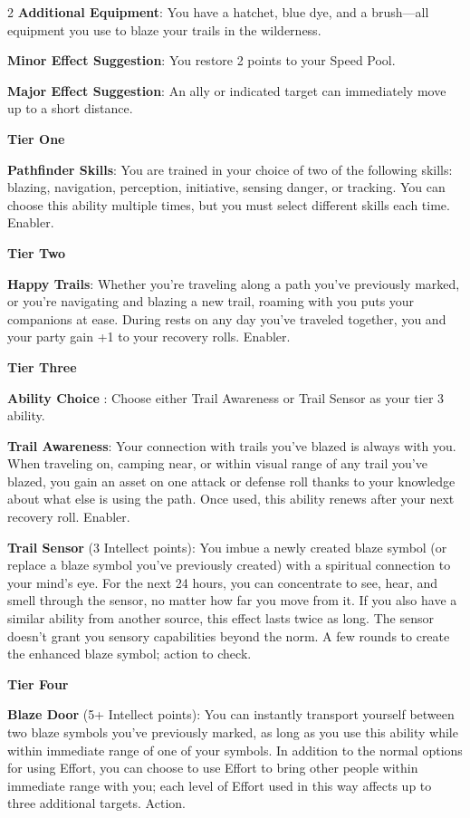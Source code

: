 \begin{multicols}{2}
\textbf{Additional Equipment}: You have a hatchet, blue dye, and a brush—all equipment you use to blaze your trails in the wilderness. 

\textbf{Minor Effect Suggestion}: You restore 2 points to your Speed Pool. 

\textbf{Major Effect Suggestion}: An ally or indicated target can immediately move up to a short distance.

\textbf{Tier One}

\textbf{Pathfinder Skills}: You are trained in your choice of two of the following skills: blazing, navigation, perception, initiative, sensing danger, or tracking. You can choose this ability multiple times, but you must select different skills each time. Enabler. 

\textbf{Tier Two}

\textbf{Happy Trails}: Whether you’re traveling along a path you’ve previously marked, or you’re navigating and blazing a new trail, roaming with you puts your companions at ease. During rests on any day you’ve traveled together, you and your party gain +1 to your recovery rolls. Enabler. 

\textbf{Tier Three}

\textbf{Ability Choice} : Choose either Trail Awareness or Trail Sensor as your tier 3 ability. 

\textbf{Trail Awareness}: Your connection with trails you’ve blazed is always with you. When traveling on, camping near, or within visual range of any trail you’ve blazed, you gain an asset on one attack or defense roll thanks to your knowledge about what else is using the path. Once used, this ability renews after your next recovery roll. Enabler. 

\textbf{Trail Sensor} (3 Intellect points): You imbue a newly created blaze symbol (or replace a blaze symbol you’ve previously created) with a spiritual connection to your mind’s eye. For the next 24 hours, you can concentrate to see, hear, and smell through the sensor, no matter how far you move from it. If you also have a similar ability from another source, this effect lasts twice as long. The sensor doesn’t grant you sensory capabilities beyond the norm. A few rounds to create the enhanced blaze symbol; action to check. 

\textbf{Tier Four}

\textbf{Blaze Door} (5+ Intellect points): You can instantly transport yourself between two blaze symbols you’ve previously marked, as long as you use this ability while within immediate range of one of your symbols. In addition to the normal options for using Effort, you can choose to use Effort to bring other people within immediate range with you; each level of Effort used in this way affects up to three additional targets. Action. 


\end{multicols}
